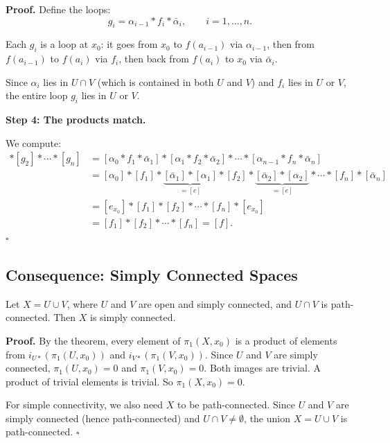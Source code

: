 \documentclass[11pt]{report}
\renewenvironment{proof}[1][Proof]{\noindent\textbf{#1.} }{\hfill$\square$\par\vspace{5pt}}
\begin{document}
\begin{proof}
Define the loops:
\[g_i = \alpha_{i-1} * f_i * \bar{\alpha}_i, \qquad i = 1, \ldots, n.\]

Each $g_i$ is a loop at $x_0$: it goes from $x_0$ to $f(a_{i-1})$ via $\alpha_{i-1}$, then from $f(a_{i-1})$ to $f(a_i)$ via $f_i$, then back from $f(a_i)$ to $x_0$ via $\bar{\alpha}_i$.

Since $\alpha_i$ lies in $U \cap V$ (which is contained in both $U$ and $V$) and $f_i$ lies in $U$ or $V$, the entire loop $g_i$ lies in $U$ or $V$.

\textbf{Step 4: The products match.}

We compute:
\begin{align*}
[g_1] * [g_2] * \cdots * [g_n] &= [\alpha_0 * f_1 * \bar{\alpha}_1] * [\alpha_1 * f_2 * \bar{\alpha}_2] * \cdots * [\alpha_{n-1} * f_n * \bar{\alpha}_n] \\
&= [\alpha_0] * [f_1] * \underbrace{[\bar{\alpha}_1] * [\alpha_1]}_{= [e]} * [f_2] * \underbrace{[\bar{\alpha}_2] * [\alpha_2]}_{= [e]} * \cdots * [f_n] * [\bar{\alpha}_n] \\
&= [e_{x_0}] * [f_1] * [f_2] * \cdots * [f_n] * [e_{x_0}] \\
&= [f_1] * [f_2] * \cdots * [f_n] = [f].
\end{align*}
\end{proof}

\subsection{Consequence: Simply Connected Spaces}

\begin{corbox}
Let $X = U \cup V$, where $U$ and $V$ are open and simply connected, and $U \cap V$ is path-connected. Then $X$ is simply connected.
\end{corbox}

\begin{proof}
By the theorem, every element of $\pi_1(X, x_0)$ is a product of elements from $i_{U*}(\pi_1(U, x_0))$ and $i_{V*}(\pi_1(V, x_0))$. Since $U$ and $V$ are simply connected, $\pi_1(U, x_0) = 0$ and $\pi_1(V, x_0) = 0$. Both images are trivial. A product of trivial elements is trivial. So $\pi_1(X, x_0) = 0$.

For simple connectivity, we also need $X$ to be path-connected. Since $U$ and $V$ are simply connected (hence path-connected) and $U \cap V \neq \emptyset$, the union $X = U \cup V$ is path-connected.
\end{proof}
\end{document}
